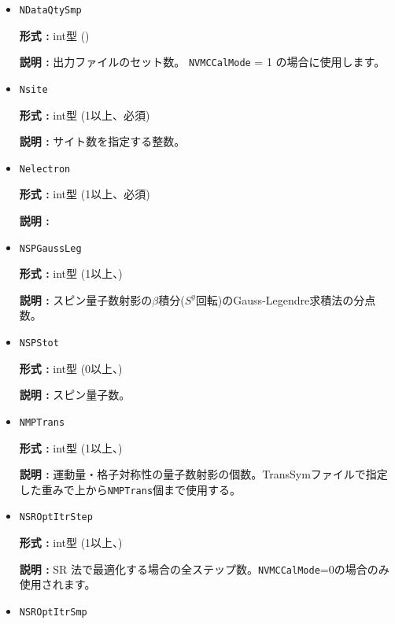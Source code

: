\begin{itemize}
 {\bf 形式 :} int型 ()

{\bf 説明 :} 出力ファイルの付加番号。\verb|NVMCCalMode|= 0 の場合は\verb|NDataIdxStart|が出力され、 \verb|NVMCCalMode| = 1 の場合は、\verb|NDataIdxStart|から連番で\verb|NDataQtySmp|個のファイルを出力します。
   
 \item  \verb|NDataQtySmp|

 {\bf 形式 :} int型 ()

{\bf 説明 :} 出力ファイルのセット数。 \verb|NVMCCalMode| = 1 の場合に使用します。

 \item  \verb|Nsite|

{\bf 形式 :} int型 (1以上、必須)

{\bf 説明 :} サイト数を指定する整数。  

\item  \verb|Nelectron|

{\bf 形式 :} {int型 (1以上、必須)}

{\bf 説明 :} 

 \item  \verb|NSPGaussLeg|

{\bf 形式 :} {int型 (1以上、)}

{\bf 説明 :} スピン量子数射影の$\beta$積分($S^y$回転)のGauss-Legendre求積法の分点数。

 \item  \verb|NSPStot|

{\bf 形式 :} int型 (0以上、)

{\bf 説明 :}  スピン量子数。

 \item  \verb|NMPTrans|

{\bf 形式 :} int型 (1以上、)

{\bf 説明 :} 
運動量・格子対称性の量子数射影の個数。TransSymファイルで指定した重みで上から\verb|NMPTrans|個まで使用する。

 \item  \verb|NSROptItrStep|

{\bf 形式 :} int型 (1以上、)

{\bf 説明 :} 
SR 法で最適化する場合の全ステップ数。\verb|NVMCCalMode|=0の場合のみ使用されます。
 
 \item  \verb|NSROptItrSmp|


\end{itemize}

